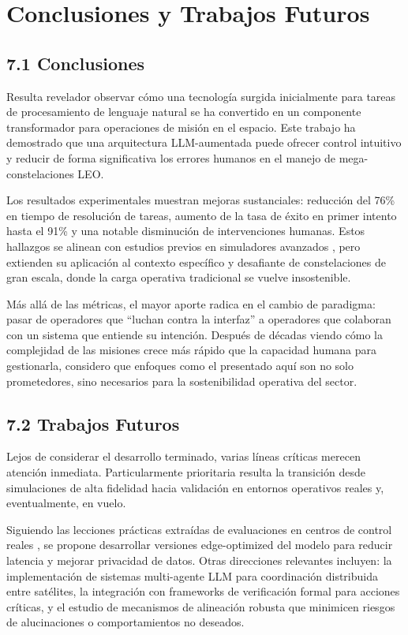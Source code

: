 \section{Conclusiones y Trabajos Futuros}

\subsection{7.1 Conclusiones}

Resulta revelador observar cómo una tecnología surgida inicialmente para tareas de procesamiento de lenguaje natural se ha convertido en un componente transformador para operaciones de misión en el espacio. Este trabajo ha demostrado que una arquitectura LLM-aumentada puede ofrecer control intuitivo y reducir de forma significativa los errores humanos en el manejo de mega-constelaciones LEO.

Los resultados experimentales muestran mejoras sustanciales: reducción del 76\% en tiempo de resolución de tareas, aumento de la tasa de éxito en primer intento hasta el 91\% y una notable disminución de intervenciones humanas. Estos hallazgos se alinean con estudios previos en simuladores avanzados \cite{carrasco2025llm}, pero extienden su aplicación al contexto específico y desafiante de constelaciones de gran escala, donde la carga operativa tradicional se vuelve insostenible.

Más allá de las métricas, el mayor aporte radica en el cambio de paradigma: pasar de operadores que “luchan contra la interfaz” a operadores que colaboran con un sistema que entiende su intención. Después de décadas viendo cómo la complejidad de las misiones crece más rápido que la capacidad humana para gestionarla, considero que enfoques como el presentado aquí son no solo prometedores, sino necesarios para la sostenibilidad operativa del sector.

\subsection{7.2 Trabajos Futuros}

Lejos de considerar el desarrollo terminado, varias líneas críticas merecen atención inmediata. Particularmente prioritaria resulta la transición desde simulaciones de alta fidelidad hacia validación en entornos operativos reales y, eventualmente, en vuelo.

Siguiendo las lecciones prácticas extraídas de evaluaciones en centros de control reales \cite{schefels2024evaluating}, se propone desarrollar versiones edge-optimized del modelo para reducir latencia y mejorar privacidad de datos. Otras direcciones relevantes incluyen: la implementación de sistemas multi-agente LLM para coordinación distribuida entre satélites, la integración con frameworks de verificación formal para acciones críticas, y el estudio de mecanismos de alineación robusta que minimicen riesgos de alucinaciones o comportamientos no deseados.

